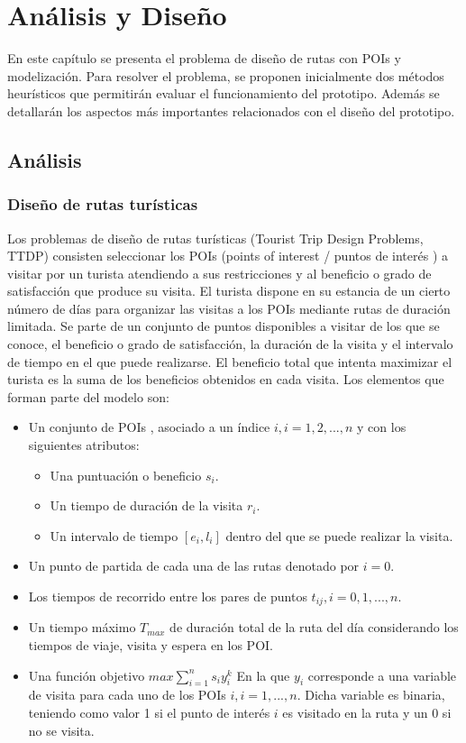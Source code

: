 \chapter{Análisis y Diseño}
En este capítulo se presenta el problema de diseño de rutas con POIs y modelización. Para resolver el problema, se proponen inicialmente dos métodos heurísticos que permitirán evaluar el funcionamiento del prototipo. Además se detallarán los aspectos más importantes relacionados con el diseño del prototipo.
\section[Análisis]{Análisis}
\subsection[Diseño de rutas turísticas]{Diseño de rutas turísticas}
Los problemas de diseño de rutas turísticas (Tourist Trip Design Problems, TTDP) consisten seleccionar los POIs (points of interest / puntos de interés ) a visitar por un turista atendiendo a sus restricciones y al beneficio o grado de satisfacción que produce su visita. El turista dispone en su estancia de un cierto número de días para organizar las visitas a los POIs mediante rutas de duración limitada. Se parte de un conjunto de puntos disponibles a visitar de los que se conoce, el beneficio o grado de satisfacción, la duración de la visita y el intervalo de tiempo en el que puede realizarse. El beneficio total que intenta maximizar el turista es la suma de los beneficios obtenidos en cada visita.\newline
Los elementos que forman parte del modelo son:
\begin{itemize}
	\item Un conjunto de POIs , asociado a un índice $i, i=1,2,...,n$ y con los siguientes atributos:
	\begin{itemize}
		\item Una puntuación o beneficio $s_i$.
		\item Un tiempo de duración de la visita $r_i$.
		\item Un intervalo de tiempo $[e_i,l_i]$ dentro del que se puede realizar la visita.
	\end{itemize}
	\item Un punto de partida de cada una de las rutas denotado por $i=0$.
	\item Los tiempos de recorrido entre los pares de puntos $t_{ij}, i=0,1,...,n$.
	\item Un tiempo máximo $T_{max}$ de duración total de la ruta del día considerando los tiempos de viaje, visita y espera en los POI.
	\item Una función objetivo $max \sum_{i=1}^{n}s_iy_i^k$ \newline
	En la que $y_i$ corresponde a una variable de visita para cada uno de los POIs $i, i=1,...,n$. Dicha variable es binaria, teniendo como valor 1 si el punto de interés $i$ es visitado en la ruta y un 0 si no se visita.
\end{itemize}
